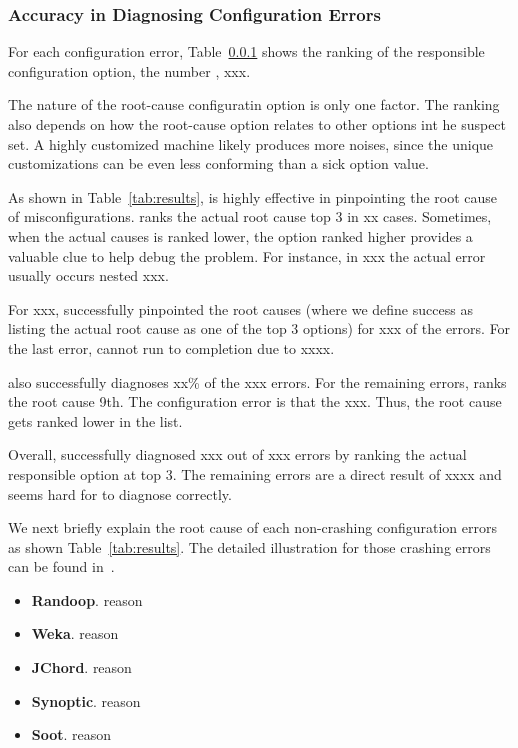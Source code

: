 \subsubsection{Accuracy in Diagnosing Configuration Errors}

For each configuration error, Table~\ref{} shows the ranking of the
responsible configuration option, the number , xxx.

The nature of the root-cause configuratin option is only one factor.
The ranking also depends on how the root-cause option relates to
other options int he suspect set. A highly customized machine
likely produces more noises, since the unique customizations
can be even less conforming than a sick option value.

As shown in Table~\ref{tab:results}, \ourtool is highly effective
in pinpointing the root cause of misconfigurations. \ourtool
ranks the actual root cause top 3 in xx cases. Sometimes,
when the actual causes is ranked lower, the option ranked
higher provides a valuable clue to help debug the problem.
For instance, in xxx the actual error usually occurs nested xxx.

For xxx, \ourtool successfully pinpointed the root causes (where
we define success as listing the actual root cause as one of the
top 3 options) for xxx of the errors. For the last error, \ourtool
cannot run to completion due to xxxx.

\ourtool also successfully diagnoses xx\% of the xxx errors. For the
remaining errors, \ourtool ranks the root cause 9th. The configuration
error is that the xxx. Thus, the root cause gets ranked lower
in the list.

Overall, \ourtool successfully diagnosed xxx out of xxx errors
by ranking the actual responsible option at top 3.
The remaining errors are a direct result of xxxx and seems
hard for \ourtool to diagnose correctly.


We next briefly explain the root cause of each non-crashing configuration
errors as shown Table~\ref{tab:results}. The detailed illustration
for those crashing errors can be found in~\cite{Rabkin:2011:PPC}.

\begin{itemize}
\item \textbf{Randoop}. reason
\item \textbf{Weka}. reason
\item \textbf{JChord}. reason
\item \textbf{Synoptic}. reason
\item \textbf{Soot}. reason
\end{itemize}


